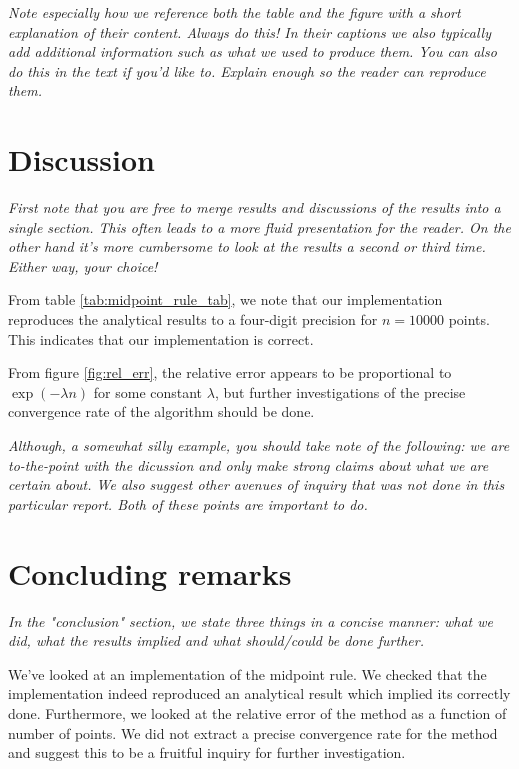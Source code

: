 \documentclass[english,notitlepage, reprint]{revtex4-1}  %
\begin{document}
\textit{Note especially how we reference both the table and the figure with a short explanation of their content. Always do this! In their captions we also typically add additional information such as what we used to produce them. You can also do this in the text if you'd like to. Explain enough so the reader can reproduce them.}

\section{Discussion}
\textit{First note that you are free to merge results and discussions of the results into a single section. This often leads to a more fluid presentation for the reader. On the other hand it's more cumbersome to look at the results a second or third time. Either way, your choice!}

From table \ref{tab:midpoint_rule_tab}, we note that our implementation reproduces the analytical results to a four-digit precision for $n = 10000$ points. This indicates that our implementation is correct.

From figure \ref{fig:rel_err}, the relative error appears to be proportional to $\exp(-\lambda n)$ for some constant $\lambda$, but further investigations of the precise convergence rate of the algorithm should be done.

\textit{Although, a somewhat silly example, you should take note of the following: we are to-the-point with the dicussion and only make strong claims about what we are certain about. We also suggest other avenues of inquiry that was not done in this particular report. Both of these points are important to do. }

\section{Concluding remarks}
\textit{In the "conclusion" section, we state three things in a concise manner: what we did, what the results implied and what should/could be done further.} 

We've looked at an implementation of the midpoint rule. We checked that the implementation indeed reproduced an analytical result which implied its correctly done. Furthermore, we looked at the relative error of the method as a function of number of points. We did not extract a precise convergence rate for the method and suggest this to be a fruitful inquiry for further investigation.
\onecolumngrid
%

	
	
\end{document}
